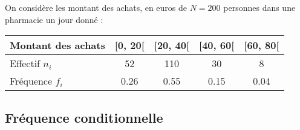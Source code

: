 \documentclass[12pt,a4paper]{article}
\begin{document}
\begin{myex}
	On considère les montant des achats, en euros de $N = 200$ personnes dans une pharmacie un jour donné :
	
	\begin{center}
		
		\begin{tabular}{|@{\ }l@{\ }|@{\ }c@{\ }|@{\ }c@{\ }|@{\ }c@{\ }|@{\ }c@{\ }|}
			\hline
			Montant des achats & {[}0, 20{[} & {[}20, 40{[} & {[}40, 60{[} & {[}60, 80{[} \\ \hline
			Effectif $n_i$      & 52          & 110          & 30           & 8            \\ \hline
			Fréquence $f_i$     & \num{0.26}        & \num{0.55}         & \num{0.15}         & \num{0.04}         \\ \hline
		\end{tabular}
	\end{center}	
\end{myex}

\subsection{Fréquence conditionnelle}


\end{document}
